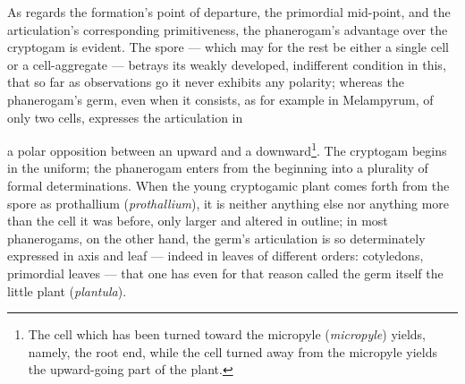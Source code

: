 \documentclass[12pt,a4paper]{book}
\begin{document}
As regards the formation's point of departure, the primordial mid-point, and the
articulation's corresponding primitiveness, the phanerogam's advantage over the
cryptogam is evident. The spore --- which may for the rest be either a single cell
or a cell-aggregate --- betrays its weakly developed, indifferent condition in
this, that so far as observations go it never exhibits any polarity; whereas the
phanerogam's germ, even when it consists, as for example in Melampyrum, of only
two cells, expresses the articulation in

\setcounter{footnote}{0}
a polar opposition between an upward and a downward\footnote{The cell which has
been turned toward the micropyle (\textit{micropyle}) yields, namely, the root
end, while the cell turned away from the micropyle yields the upward-going part of
the plant.}. The cryptogam begins in the uniform; the phanerogam enters from the
beginning into a plurality of formal determinations. When the young cryptogamic
plant comes forth from the spore as prothallium (\textit{prothallium}), it is
neither anything else nor anything more than the cell it was before, only larger
and altered in outline; in most phanerogams, on the other hand, the germ's
articulation is so determinately expressed in axis and leaf --- indeed in leaves of
different orders: cotyledons, primordial leaves --- that one has even for that
reason called the germ itself the little plant (\textit{plantula}).
\end{document}
